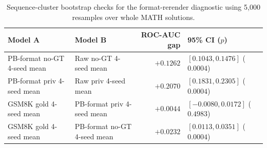\begin{table}[t]
\centering
\small
{}
\caption{Format-rerender same-source GSM8K diagnostic. PB-format rows use the same Gemma-4 labels re-rendered into the ProcessBench first-error convention with binary scores and literal feedback. Parentheses show seed ranges.}
\label{tab:format-rerender-gsm8k}
\end{table}

\begin{table}[t]
\centering
\small
\begin{tabular}{llrl}
\toprule
Model A & Model B & ROC-AUC gap & 95\% CI ($p$) \\
\midrule
PB-format no-GT 4-seed mean & Raw no-GT 4-seed mean & $+0.1262$ & $[0.1043, 0.1476]$ ($0.0004$) \\
PB-format priv 4-seed mean & Raw priv 4-seed mean & $+0.2070$ & $[0.1831, 0.2305]$ ($0.0004$) \\
GSM8K gold 4-seed mean & PB-format priv 4-seed mean & $+0.0044$ & $[-0.0080, 0.0172]$ ($0.4983$) \\
GSM8K gold 4-seed mean & PB-format no-GT 4-seed mean & $+0.0232$ & $[0.0113, 0.0351]$ ($0.0004$) \\
\bottomrule
\end{tabular}
\caption{Sequence-cluster bootstrap checks for the format-rerender diagnostic using 5{,}000 resamples over whole MATH solutions.}
\label{tab:format-rerender-bootstrap}
\end{table}
